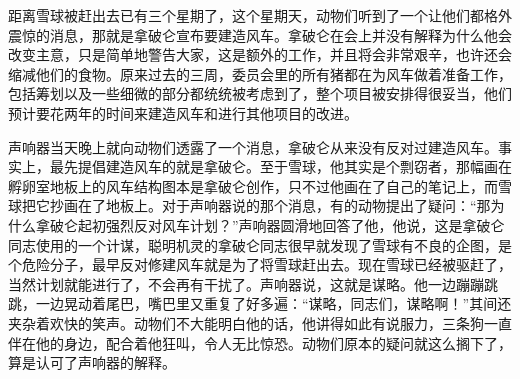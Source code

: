 距离雪球被赶出去已有三个星期了，这个星期天，动物们听到了一个让他们都格外震惊的消息，那就是拿破仑宣布要建造风车。拿破仑在会上并没有解释为什么他会改变主意，只是简单地警告大家，这是额外的工作，并且将会非常艰辛，也许还会缩减他们的食物。原来过去的三周，委员会里的所有猪都在为风车做着准备工作，包括筹划以及一些细微的部分都统统被考虑到了，整个项目被安排得很妥当，他们预计要花两年的时间来建造风车和进行其他项目的改进。

声响器当天晚上就向动物们透露了一个消息，拿破仑从来没有反对过建造风车。事实上，最先提倡建造风车的就是拿破仑。至于雪球，他其实是个剽窃者，那幅画在孵卵室地板上的风车结构图本是拿破仑创作，只不过他画在了自己的笔记上，而雪球把它抄画在了地板上。对于声响器说的那个消息，有的动物提出了疑问：“那为什么拿破仑起初强烈反对风车计划？”声响器圆滑地回答了他，他说，这是拿破仑同志使用的一个计谋，聪明机灵的拿破仑同志很早就发现了雪球有不良的企图，是个危险分子，最早反对修建风车就是为了将雪球赶出去。现在雪球已经被驱赶了，当然计划就能进行了，不会再有干扰了。声响器说，这就是谋略。他一边蹦蹦跳跳，一边晃动着尾巴，嘴巴里又重复了好多遍：“谋略，同志们，谋略啊！”其间还夹杂着欢快的笑声。动物们不大能明白他的话，他讲得如此有说服力，三条狗一直伴在他的身边，配合着他狂叫，令人无比惊恐。动物们原本的疑问就这么搁下了，算是认可了声响器的解释。
